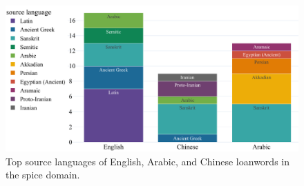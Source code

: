 \begin{figure}[!ht]
  \centering
  \includegraphics[width=\linewidth]{imgs/plots/source_bar.pdf}
  \caption{Top source languages of English, Arabic, and Chinese loanwords in the spice domain.}
  \label{fig:source_bar}
\end{figure}




